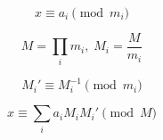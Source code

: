 $$ x \equiv a_i \pmod {m_i} $$

$$ M = \prod_i m_i,\; M_i = \frac M {m_i} $$

$$ M_i' \equiv M_i^{-1} \pmod {m_i} $$

$$ x \equiv \sum_{i} a_i M_i M_i' \pmod M $$